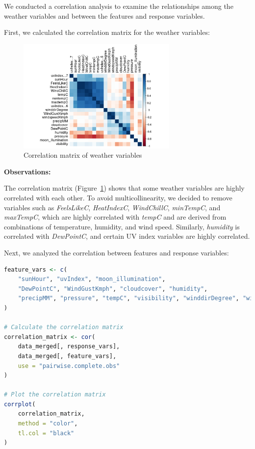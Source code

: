 \documentclass[12pt]{article}
\begin{document}
We conducted a correlation analysis to examine the relationships among the weather variables and between the features and response variables.

First, we calculated the correlation matrix for the weather variables:

\begin{figure}[H]
    \centering
    \includegraphics[width=0.7\textwidth]{correlation-matrix.png}
    \caption{Correlation matrix of weather variables}
    \label{fig:correlation_matrix}
\end{figure}

\textbf{Observations:}

The correlation matrix (Figure~\ref{fig:correlation_matrix}) shows that some weather variables are highly correlated with each other. To avoid multicollinearity, we decided to remove variables such as \textit{FeelsLikeC}, \textit{HeatIndexC}, \textit{WindChillC}, \textit{minTempC}, and \textit{maxTempC}, which are highly correlated with \textit{tempC} and are derived from combinations of temperature, humidity, and wind speed. Similarly, \textit{humidity} is correlated with \textit{DewPointC}, and certain UV index variables are highly correlated.

Next, we analyzed the correlation between features and response variables:

\begin{lstlisting}[language=R]
feature_vars <- c(
    "sunHour", "uvIndex", "moon_illumination",
    "DewPointC", "WindGustKmph", "cloudcover", "humidity",
    "precipMM", "pressure", "tempC", "visibility", "winddirDegree", "windspeedKmph"
)

# Calculate the correlation matrix
correlation_matrix <- cor(
    data_merged[, response_vars],
    data_merged[, feature_vars],
    use = "pairwise.complete.obs"
)

# Plot the correlation matrix
corrplot(
    correlation_matrix,
    method = "color",
    tl.col = "black"
)
\end{lstlisting}
\end{document}
